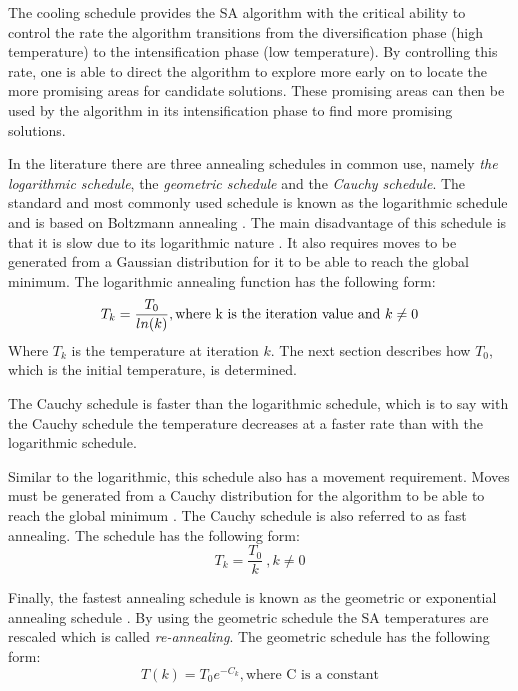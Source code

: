 The cooling schedule provides the \gls{SA} algorithm with the critical ability to control the rate the algorithm transitions from the diversification phase (high temperature) to the intensification phase (low temperature)\cite{ClusterSA}. By controlling this rate, one is able to direct the algorithm to explore more early on to locate the more promising areas for candidate solutions. These promising areas can then be used by the algorithm in its intensification phase to find more promising solutions.

In the literature there are three annealing schedules in common use, namely \emph{the logarithmic schedule}, the \emph{geometric schedule} and the \emph{Cauchy schedule}\cite{VeryFastSAImageEnchancement,SASingleMultiObj}. 
The standard and most commonly used schedule is known as the logarithmic schedule and is based on Boltzmann annealing \cite{VeryFastSAImageEnchancement}. The main disadvantage of this schedule is that it is slow due to its logarithmic nature \cite{VeryFastSAImageEnchancement}. It also requires moves to be generated from a Gaussian distribution for it to be able to reach the global minimum\cite{SASingleMultiObj}. The logarithmic annealing function has the following form:
\begin{equation}
\label{eq:logcooling}
	T_k = \frac{T_0}{ln(k)},\text{where k is the iteration value and } k \neq 0\\
\end{equation}
Where $T_k$ is the temperature at iteration $k$. The next section describes how $T_0$, which is the initial temperature, is determined.

The Cauchy schedule is faster than the logarithmic schedule, which is to say with the Cauchy schedule the temperature decreases at a faster rate than with the logarithmic schedule. 

Similar to the logarithmic, this schedule also has a movement requirement. Moves must be generated from a Cauchy distribution for the algorithm to be able to reach the global minimum \cite{SASingleMultiObj,VeryFastSAImageEnchancement}. The Cauchy schedule is also referred to as fast annealing\cite{VeryFastSAImageEnchancement}. The schedule has the following form:
\begin{equation}
\label{eq:cauchycooling}
	T_k = \frac{T_0}{k} ~, k \neq 0
\end{equation}

Finally, the fastest annealing schedule is known as the geometric or exponential annealing schedule \cite{SASingleMultiObj}. By using the geometric schedule the \gls{SA} temperatures are rescaled which is called \emph{re-annealing}\cite{VeryFastSAImageEnchancement}.
The geometric schedule has the following form:
\begin{equation}
\label{eq:geocooling}
	T(k)=T_0e^{-C_k},\text{where C is a constant}
\end{equation}

